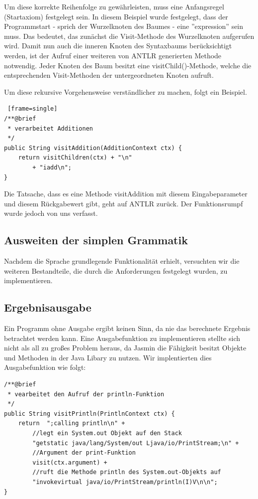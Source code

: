 \documentclass[12pt, a4paper, oneside, ngerman]{article}
\begin{document}
Um diese korrekte Reihenfolge zu gewährleisten, muss eine Anfangsregel (Startaxiom) festgelegt sein. In diesem Beispiel wurde festgelegt, dass der Programmstart - sprich der Wurzelknoten des Baumes - eine ''expression'' sein muss. Das bedeutet, das zunächst die Visit-Methode des Wurzelknoten aufgerufen wird. Damit nun auch die inneren Knoten des Syntaxbaums berücksichtigt werden, ist der Aufruf einer weiteren von ANTLR generierten Methode notwendig. Jeder Knoten des Baum besitzt eine visitChild()-Methode, welche die entsprechenden Visit-Methoden der untergeordneten Knoten aufruft.

Um diese rekursive Vorgehensweise verständlicher zu machen, folgt ein Beispiel.


\begin{lstlisting} [frame=single]
/**@brief
 * verarbeitet Additionen
 */
public String visitAddition(AdditionContext ctx) {
	return visitChildren(ctx) + "\n"
		+ "iadd\n";
}
\end{lstlisting}
Die Tatsache, dass es eine Methode visitAddition mit diesem Eingabeparameter und diesem Rückgabewert gibt, geht auf ANTLR zurück. Der Funktionsrumpf wurde jedoch von uns verfasst.



\subsection{Ausweiten der simplen Grammatik}
Nachdem die Sprache grundlegende Funktionalität erhielt, versuchten wir die weiteren Bestandteile, die durch die Anforderungen festgelegt wurden, zu implementieren. 


\subsection*{Ergebnisausgabe}
Ein Programm ohne Ausgabe ergibt keinen Sinn, da nie das berechnete Ergebnis betrachtet werden kann. Eine Ausgabefunktion zu implementieren stellte sich nicht als all zu großes Problem heraus, da Jasmin die Fähigkeit besitzt Objekte und Methoden in der Java Libary zu nutzen. Wir implentierten dies Ausgabefunktion wie folgt:

\begin{lstlisting}[frame=single]
/**@brief
 * vearbeitet den Aufruf der println-Funktion
 */
public String visitPrintln(PrintlnContext ctx) {
	return  ";calling println\n" + 
		//legt ein System.out Objekt auf den Stack
		"getstatic java/lang/System/out Ljava/io/PrintStream;\n" + 	
		//Argument der print-Funktion
		visit(ctx.argument) + 						
		//ruft die Methode println des System.out-Objekts auf
		"invokevirtual java/io/PrintStream/println(I)V\n\n"; 				
}
\end{lstlisting}
\end{document}

